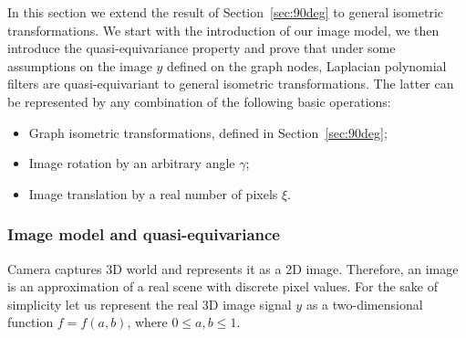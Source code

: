 \documentclass[10pt,journal,compsoc]{IEEEtran}
\begin{document}
	In this section we extend the result of Section~\ref{sec:90deg} to general isometric transformations. We start with the introduction of our image model, we then introduce the quasi-equivariance property and prove that under some assumptions on the  image $y$ defined on the graph nodes, Laplacian polynomial filters are quasi-equivariant to general isometric transformations. The latter
	can be represented by any combination of the following basic operations:
	\begin{itemize}
		\setlength\itemsep{0pt}
		\setlength{\parskip}{0pt}
		\item Graph isometric transformations, defined in Section~\ref{sec:90deg};
		\item Image rotation by an arbitrary angle $\gamma$;
		\item Image translation by a real number of pixels $\xi$.
	\end{itemize}

	\subsubsection{Image model and quasi-equivariance}

	Camera captures 3D world and represents it as a 2D image. Therefore, an image is an approximation of a real scene with discrete pixel values. For the sake of simplicity let us represent the real 3D image signal $y$ as a two-dimensional function $f = f(a,b)$, where $0 \leq a,b \leq 1$.
\end{document}
